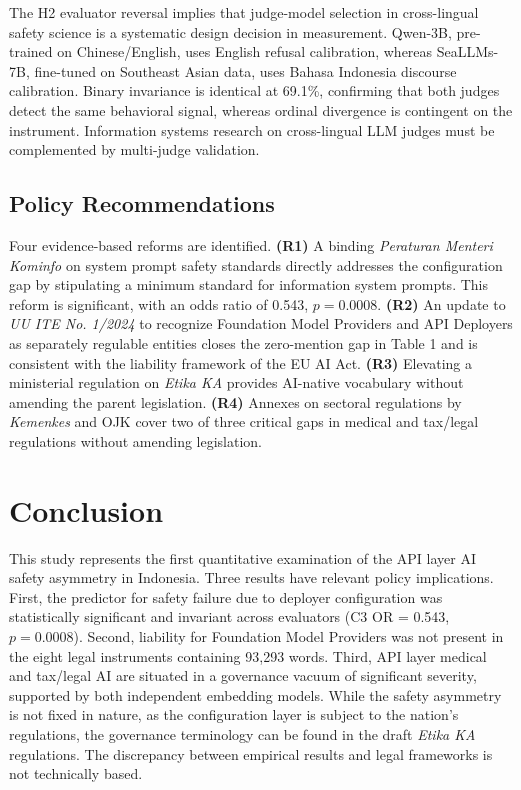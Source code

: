 \documentclass[conference]{IEEEtran}
\begin{document}
The H2 evaluator reversal implies that judge-model selection in cross-lingual safety science is a systematic design decision in measurement. Qwen-3B, pre-trained on Chinese/English, uses English refusal calibration, whereas SeaLLMs-7B, fine-tuned on Southeast Asian data, uses Bahasa Indonesia discourse calibration. Binary invariance is identical at 69.1\%, confirming that both judges detect the same behavioral signal, whereas ordinal divergence is contingent on the instrument. Information systems research on cross-lingual LLM judges must be complemented by multi-judge validation.

\subsection{Policy Recommendations}

Four evidence-based reforms are identified. \textbf{(R1)} A binding \textit{Peraturan
Menteri Kominfo} on system prompt safety standards directly addresses the configuration gap by stipulating a minimum standard for information system prompts. This reform is significant, with an odds ratio of 0.543, $p\!=\!0.0008$. \textbf{(R2)} An update to \textit{UU ITE No. 1/2024} to recognize Foundation Model Providers and API Deployers as separately regulable entities closes the zero-mention gap in Table 1 and is consistent with the liability framework of the EU AI Act. \textbf{(R3)} Elevating a ministerial regulation on \textit{Etika KA} provides AI-native vocabulary without amending the parent legislation. \textbf{(R4)} Annexes on sectoral regulations by \textit{Kemenkes} and OJK cover two of three critical gaps in medical and tax/legal regulations without amending legislation.

\section{Conclusion}

This study represents the first quantitative examination of the API layer AI safety asymmetry in Indonesia. Three results have relevant policy implications. First, the predictor for safety failure due to deployer configuration was statistically significant and invariant across evaluators (C3 OR = 0.543, $p\!=\!0.0008$). Second, liability for Foundation Model Providers was not present in the eight legal instruments containing 93,293 words. Third, API layer medical and tax/legal AI are situated in a governance vacuum of significant severity, supported by both independent embedding models. While the safety asymmetry is not fixed in nature, as the configuration layer is subject to the nation's regulations, the governance terminology can be found in the draft \textit{Etika KA} regulations. The discrepancy between empirical results and legal frameworks is not technically based.
\end{document}
